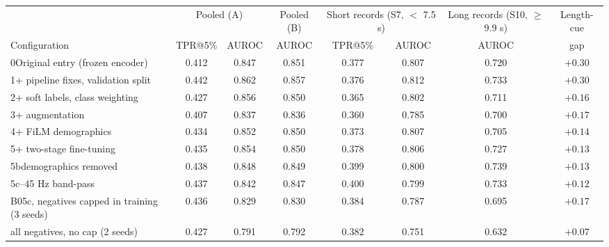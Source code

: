 \begin{tabular}{l c c c c c c c}
\hline
 & \multicolumn{2}{c}{Pooled (A)} & Pooled (B) & \multicolumn{2}{c}{Short records (S7, $<$ 7.5 s)} & Long records (S10, $\geq$ 9.9 s) & Length-cue \\
Configuration & TPR@5\% & AUROC & AUROC & TPR@5\% & AUROC & AUROC & gap \\
\hline
0\quad Original entry (frozen encoder) & 0.412 & 0.847 & 0.851 & 0.377 & 0.807 & 0.720 & $+0.30$ \\
1\quad + pipeline fixes, validation split & 0.442 & 0.862 & 0.857 & 0.376 & 0.812 & 0.733 & $+0.30$ \\
2\quad + soft labels, class weighting & 0.427 & 0.856 & 0.850 & 0.365 & 0.802 & 0.711 & $+0.16$ \\
3\quad + augmentation & 0.407 & 0.837 & 0.836 & 0.360 & 0.785 & 0.700 & $+0.17$ \\
4\quad + FiLM demographics & 0.434 & 0.852 & 0.850 & 0.373 & 0.807 & 0.705 & $+0.14$ \\
5\quad + two-stage fine-tuning & 0.435 & 0.854 & 0.850 & 0.378 & 0.806 & 0.727 & $+0.13$ \\
5b\quad demographics removed & 0.438 & 0.848 & 0.849 & 0.399 & 0.800 & 0.739 & $+0.13$ \\
5c\quad 0.5--45 Hz band-pass & 0.437 & 0.842 & 0.847 & 0.400 & 0.799 & 0.733 & $+0.12$ \\
B0\quad 5c, negatives capped in training (3 seeds) & 0.436 & 0.829 & 0.830 & 0.384 & 0.787 & 0.695 & $+0.17$ \\
\phantom{B0}\quad all negatives, no cap (2 seeds) & 0.427 & 0.791 & 0.792 & 0.382 & 0.751 & 0.632 & $+0.07$ \\
\hline
\end{tabular}
